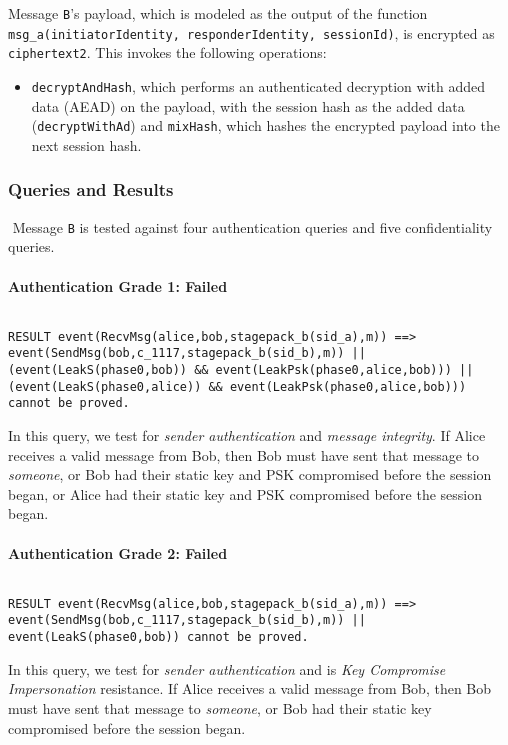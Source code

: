 Message \texttt{B}'s payload, which is modeled as the output of the function \texttt{msg\_a(initiatorIdentity, responderIdentity, sessionId)}, is encrypted as \texttt{ciphertext2}. This invokes the following operations:


\begin{itemize}

\item \texttt{decryptAndHash}, which performs an authenticated decryption with added data (AEAD) on the payload, with the session hash as the added data (\texttt{decryptWithAd}) and \texttt{mixHash}, which hashes the encrypted payload into the next session hash.

\end{itemize}
\subsubsection{Queries and Results}$ $
Message \texttt{B} is tested against four authentication queries and five confidentiality queries.
\paragraph{Authentication Grade 1: Failed}$ $
\begin{lstlisting}
RESULT event(RecvMsg(alice,bob,stagepack_b(sid_a),m)) ==> event(SendMsg(bob,c_1117,stagepack_b(sid_b),m)) || (event(LeakS(phase0,bob)) && event(LeakPsk(phase0,alice,bob))) || (event(LeakS(phase0,alice)) && event(LeakPsk(phase0,alice,bob))) cannot be proved.
\end{lstlisting}

In this query, we test for \emph{sender authentication} and \emph{message integrity}. If Alice receives a valid message from Bob, then Bob must have sent that message to \emph{someone}, or Bob had their static key and PSK compromised before the session began, or Alice had their static key and PSK compromised before the session began.


\paragraph{Authentication Grade 2: Failed}$ $
\begin{lstlisting}
RESULT event(RecvMsg(alice,bob,stagepack_b(sid_a),m)) ==> event(SendMsg(bob,c_1117,stagepack_b(sid_b),m)) || event(LeakS(phase0,bob)) cannot be proved.
\end{lstlisting}

In this query, we test for \emph{sender authentication} and is \emph{Key Compromise Impersonation} resistance. If Alice receives a valid message from Bob, then Bob must have sent that message to \emph{someone}, or Bob had their static key compromised before the session began.


